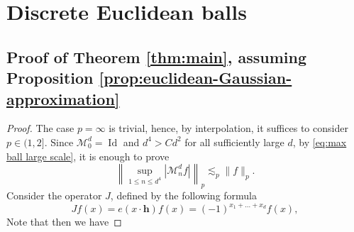\documentclass{article}
\DeclareMathOperator{\Id}{Id}
\theoremstyle{plain}
\numberwithin{equation}{section}
\begin{document}
\section{Discrete Euclidean balls}
\label{sec: balls}

\subsection{Proof of Theorem \ref{thm:main}, assuming Proposition \ref{prop:euclidean-Gaussian-approximation}}
\label{ssec: main from prop}
\begin{proof}  
    The case $p= \infty$ is trivial, hence, by interpolation, it suffices to consider $p \in (1, 2]$. Since $\mathcal M_0^d=\Id$ and $d^4>Cd^2$ for all sufficiently
large $d$, by \eqref{eq:max ball large scale}, it is enough to prove
\begin{equation*}
 \left\|\sup_{1\leq n\leq d^4}|\mathcal M_n^d f|\right\|_{p}
 \lesssim_{p} \|f\|_{p}.
\end{equation*}
Consider the operator $J$, defined by the following formula
\begin{equation*}
    Jf(x)= e(x \cdot \mathbf{h}) f(x)= (-1)^{x_1+\ldots+x_d} f(x),
\end{equation*}
Note that then we have 


\end{proof}
\end{document}
